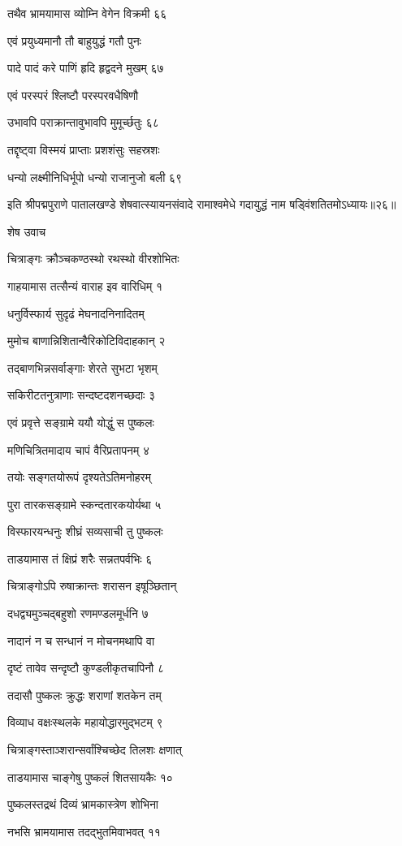 तथैव भ्रामयामास व्योम्नि वेगेन विक्रमी ६६

एवं प्रयुध्यमानौ तौ बाहुयुद्धं गतौ पुनः

पादे पादं करे पाणिं हृदि हृद्वदने मुखम् ६७

एवं परस्परं श्लिष्टौ परस्परवधैषिणौ

उभावपि पराक्रान्तावुभावपि मुमूर्च्छतुः ६८

तद्दृष्ट्वा विस्मयं प्राप्ताः प्रशशंसुः सहस्रशः

धन्यो लक्ष्मीनिधिर्भूपो धन्यो राजानुजो बली ६९

इति श्रीपद्मपुराणे पातालखण्डे शेषवात्स्यायनसंवादे रामाश्वमेधे गदायुद्धं नाम षड्विंशतितमोऽध्यायः॥२६॥


शेष उवाच

चित्राङ्गः क्रौञ्चकण्ठस्थो रथस्थो वीरशोभितः

गाहयामास तत्सैन्यं वाराह इव वारिधिम् १

धनुर्विस्फार्य सुदृढं मेघनादनिनादितम्

मुमोच बाणान्निशितान्वैरिकोटिविदाहकान् २

तद्बाणभिन्नसर्वाङ्गाः शेरते सुभटा भृशम्

सकिरीटतनुत्राणाः सन्दष्टदशनच्छदाः ३

एवं प्रवृत्ते सङ्ग्रामे ययौ योद्धुं स पुष्कलः

मणिचित्रितमादाय चापं वैरिप्रतापनम् ४

तयोः सङ्गतयोरूपं दृश्यतेऽतिमनोहरम्

पुरा तारकसङ्ग्रामे स्कन्दतारकयोर्यथा ५

विस्फारयन्धनुः शीघ्रं सव्यसाची तु पुष्कलः

ताडयामास तं क्षिप्रं शरैः सन्नतपर्वभिः ६

चित्राङ्गोऽपि रुषाक्रान्तः शरासन इषूञ्छितान्

दधद्व्यमुञ्चद्बहुशो रणमण्डलमूर्धनि ७

नादानं न च सन्धानं न मोचनमथापि वा

दृष्टं तावेव सन्दृष्टौ कुण्डलीकृतचापिनौ ८

तदासौ पुष्कलः क्रुद्धः शराणां शतकेन तम्

विव्याध वक्षःस्थलके महायोद्धारमुद्भटम् ९

चित्राङ्गस्ताञ्शरान्सर्वांश्चिच्छेद तिलशः क्षणात्

ताडयामास चाङ्गेषु पुष्कलं शितसायकैः १०

पुष्कलस्तद्रथं दिव्यं भ्रामकास्त्रेण शोभिना

नभसि भ्रामयामास तदद्भुतमिवाभवत् ११

